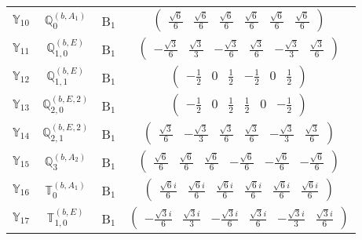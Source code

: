 \documentclass[fleqn,10pt,landscape]{article}
\begin{document}
\begin{itemize}
\begin{center}
\begin{longtable}{c|c|c|c}
$ \mathbb{Y}_{10} $ & $\mathbb{Q}_{0}^{(b,A_{1})}$ & B$_{1}$ & $\begin{pmatrix} \frac{\sqrt{6}}{6} & \frac{\sqrt{6}}{6} & \frac{\sqrt{6}}{6} & \frac{\sqrt{6}}{6} & \frac{\sqrt{6}}{6} & \frac{\sqrt{6}}{6} \end{pmatrix}$ \\
$ \mathbb{Y}_{11} $ & $\mathbb{Q}_{1,0}^{(b,E)}$ & B$_{1}$ & $\begin{pmatrix} - \frac{\sqrt{3}}{6} & \frac{\sqrt{3}}{3} & - \frac{\sqrt{3}}{6} & \frac{\sqrt{3}}{6} & - \frac{\sqrt{3}}{3} & \frac{\sqrt{3}}{6} \end{pmatrix}$ \\
$ \mathbb{Y}_{12} $ & $\mathbb{Q}_{1,1}^{(b,E)}$ & B$_{1}$ & $\begin{pmatrix} - \frac{1}{2} & 0 & \frac{1}{2} & - \frac{1}{2} & 0 & \frac{1}{2} \end{pmatrix}$ \\
$ \mathbb{Y}_{13} $ & $\mathbb{Q}_{2,0}^{(b,E,2)}$ & B$_{1}$ & $\begin{pmatrix} - \frac{1}{2} & 0 & \frac{1}{2} & \frac{1}{2} & 0 & - \frac{1}{2} \end{pmatrix}$ \\
$ \mathbb{Y}_{14} $ & $\mathbb{Q}_{2,1}^{(b,E,2)}$ & B$_{1}$ & $\begin{pmatrix} \frac{\sqrt{3}}{6} & - \frac{\sqrt{3}}{3} & \frac{\sqrt{3}}{6} & \frac{\sqrt{3}}{6} & - \frac{\sqrt{3}}{3} & \frac{\sqrt{3}}{6} \end{pmatrix}$ \\
$ \mathbb{Y}_{15} $ & $\mathbb{Q}_{3}^{(b,A_{2})}$ & B$_{1}$ & $\begin{pmatrix} \frac{\sqrt{6}}{6} & \frac{\sqrt{6}}{6} & \frac{\sqrt{6}}{6} & - \frac{\sqrt{6}}{6} & - \frac{\sqrt{6}}{6} & - \frac{\sqrt{6}}{6} \end{pmatrix}$ \\
$ \mathbb{Y}_{16} $ & $\mathbb{T}_{0}^{(b,A_{1})}$ & B$_{1}$ & $\begin{pmatrix} \frac{\sqrt{6} i}{6} & \frac{\sqrt{6} i}{6} & \frac{\sqrt{6} i}{6} & \frac{\sqrt{6} i}{6} & \frac{\sqrt{6} i}{6} & \frac{\sqrt{6} i}{6} \end{pmatrix}$ \\
$ \mathbb{Y}_{17} $ & $\mathbb{T}_{1,0}^{(b,E)}$ & B$_{1}$ & $\begin{pmatrix} - \frac{\sqrt{3} i}{6} & \frac{\sqrt{3} i}{3} & - \frac{\sqrt{3} i}{6} & \frac{\sqrt{3} i}{6} & - \frac{\sqrt{3} i}{3} & \frac{\sqrt{3} i}{6} \end{pmatrix}$ \\

\end{longtable}
\end{center}
\end{itemize}
\end{document}
